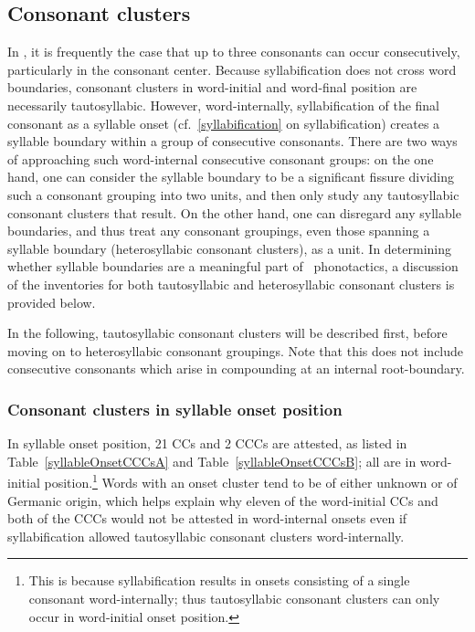 \subsection{Consonant clusters}\label{CClusters}
In \PS, it is frequently the case that up to three consonants can occur consecutively, particularly in the consonant center. Because syllabification does not cross word boundaries, consonant clusters in word-initial and word-final position are necessarily tautosyllabic. However, word-internally, syllabification of the final consonant as a syllable onset (cf.~\SEC\ref{syllabification} on syllabification) creates a syllable boundary within a group of consecutive consonants. There are two ways of approaching such word-internal consecutive consonant groups: on the one hand, one can consider the syllable boundary to be a significant fissure dividing such a consonant grouping into two units, and then only study any tautosyllabic consonant clusters that result. On the other hand, one can disregard any syllable boundaries, and thus treat any consonant groupings, even those spanning a syllable boundary (heterosyllabic consonant clusters), as a unit. 
In determining whether syllable boundaries are a meaningful part of \PS\ phonotactics, a discussion of the inventories for both tautosyllabic and heterosyllabic consonant clusters is provided below. 

In the following, tautosyllabic consonant clusters will be described first, before moving on to heterosyllabic consonant groupings. Note that this does not include consecutive consonants which arise in compounding at an internal root-boundary.


\subsubsection[CCs in onset position]{Consonant clusters in syllable onset position}
In syllable onset position, 21 CCs and 2 CCCs are attested, as listed in Table~\ref{syllableOnsetCCCsA} and Table~\vref{syllableOnsetCCCsB}; %
all are in word-initial position.\footnote{This is because syllabification results in onsets consisting of a single consonant word-internally; thus tautosyllabic consonant clusters can only occur in word-initial onset position.} 
Words with an onset cluster tend to be of either unknown or of Germanic origin, %
which helps explain why eleven of the word-initial CCs and both of the CCCs would not be attested in word-internal onsets even if syllabification allowed tautosyllabic consonant clusters word-internally. %

